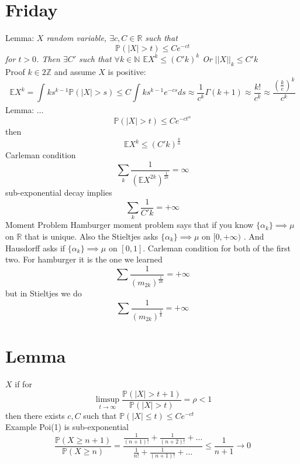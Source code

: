 \documentclass[11pt]{article}
\begin{document}
\section{Friday}

Lemma:
\emph{
    $X$ random variable, $\exists c,C \in \mathbb{R}$ such that
     \[
    \mathbb{P}(|X| > t) \le Ce^{-ct}
    \] 
    for $t > 0$.
    Then $\exists C'$ such that  $\forall k \in \mathbb{N}$ $ \mathbb{E}X^{k} \le (C'k)^{k}$ 
    Or $||X||_k \le C'k$
}\\
Proof $k \in 2 \mathbb{Z}$ and assume $X$ is positive: 
\[
\mathbb{E}X^{k} = \int_{}^{}ks^{k-1} \mathbb{P}(|X| > s) \le C\int_{}^{}ks^{k-1}e^{-cs}ds \approx \frac{1}{c^{k}}\Gamma(k+1) \approx \frac{k!}{c^{k}} \approx \frac{\left( \frac{k}{e} \right)^{k}}{c^{k}}
\] 
Lemma: $\dots$
 \[
\mathbb{P}(|X| > t) \le Ce^{-ct^{\alpha}}
\] 
then
\[
\mathbb{E}X^{k} \le (C'k)^{\frac{k}{\alpha}}
\] 
Carleman condition
\[
\sum_{k}^{}\frac{1}{ (\mathbb{E} X^{2k})^{\frac{1}{2k}}} = \infty
\] 
sub-exponential decay implies
\[
\sum_{k}^{}\frac{1}{C'k} = +\infty
\] 
Moment Problem
Hamburger moment problem  says that if you know $\{\alpha_k\} \implies \mu$ on $ \mathbb{R}$ that is unique.
Also the Stieltjes asks  $\{\alpha_k\} \implies \mu$ on $[0,+\infty)$ . And Hausdorff asks if
$\{\alpha_k\} \implies \mu$ on $[0,1]$. Carleman condition for both of the first two. For hamburger it is the one we learned
 \[
     \sum_{}^{{}}\frac{1}{(m_{2k})^{\frac{1}{2k}}} = +\infty
\] 
but in Stieltjes we do
\[
    \sum_{}^{}\frac{1}{(m_{2k})^{\frac{1}{k}}} = +\infty
\] 
\section{Lemma}
$X$ if for 
\[
\limsup_{t\to \infty } \frac{\mathbb{P}(|X| > t + 1)}{ \mathbb{P}(|X| > t)} = \rho < 1
\] 
then there exists $c, C $ such that $ \mathbb{P}(|X| \le t ) \le Ce^{-ct}$ \\
Example Poi(1) is sub-exponential
\[
    \frac{\mathbb{P}(X \ge n+1)}{ \mathbb{P}(X \ge n)} = \frac{\frac{1}{(n+1)!} + \frac{1}{(n+2)!} + \dots}{\frac{1}{n!} + \frac{1}{(n+1)!} + \dots} \le \frac{1}{n+1} \rightarrow 0
\] 
\end{document}
